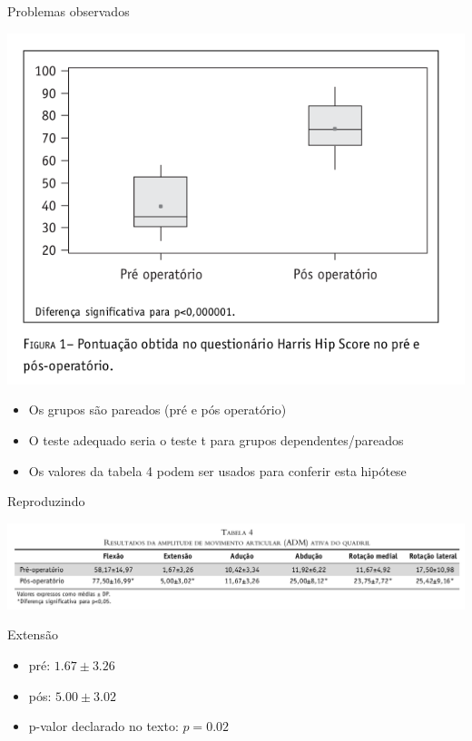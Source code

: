 \documentclass{beamer}
\begin{document}
\begin{frame}{Problemas observados}
  \begin{center}
    \includegraphics[height=.5\textheight]{figuras/figura1}
  \end{center}
  \begin{itemize}
  \item Os grupos são pareados (pré e pós operatório)
  \item O teste adequado seria o teste t para grupos dependentes/pareados
  \item Os valores da tabela 4 podem ser usados para conferir esta hipótese
  \end{itemize}
\end{frame}

\begin{frame}{Reproduzindo}
  \begin{center}
    \includegraphics[width=1.15\textwidth]{figuras/tabela4}
  \end{center}
  \begin{exampleblock}{Extensão}
    \begin{itemize}
    \item pré: $1.67 \pm 3.26$
    \item pós: $5.00 \pm 3.02$
    \item p-valor declarado no texto: $p=0.02$
    \end{itemize}
  \end{exampleblock}
\end{frame}
\end{document}
